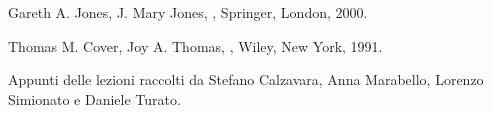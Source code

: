 \clearpage
{} 
{}

\begin{thebibliography}{3}

Gareth A. Jones, J. Mary Jones,
,
\newblock Springer, London, 2000.

Thomas M. Cover, Joy A. Thomas,
,
\newblock Wiley, New York, 1991.


Appunti delle lezioni raccolti da Stefano Calzavara, Anna Marabello, Lorenzo Simionato e Daniele Turato.

\end{thebibliography}
